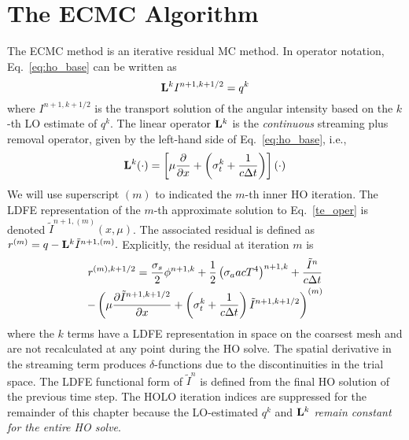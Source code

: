 \section{The ECMC Algorithm}
\label{sec:ecmc}

The ECMC method is an iterative residual MC method. 
In operator notation, Eq.~\eqref{eq:ho_base} can be written as
\begin{equation}\label{te_oper}
\mathbf{L}^k I^{n+1,k+1/2}  = q^{k}
\end{equation}
where $I^{n+1,k+1/2}$ is the transport solution of the angular intensity based on the
$k$-th LO estimate of $q^k$.
The linear operator $\mathbf{L}^k$ is the \emph{continuous} streaming plus
removal operator, given by the left-hand
side of Eq.~\eqref{eq:ho_base}, i.e.,
\begin{equation}
    \mathbf{L}^k(\cdot) = \left[\mu \frac{\partial }{\partial x} + \left(\sigma_t^k + \frac{1}{c \Delta t
    }\right)\right] \left(\cdot\right)
\end{equation}
We will use superscript $(m)$ to indicated the $m$-th inner HO iteration.  The LDFE
representation of the $m$-th
approximate solution to Eq.~\eqref{te_oper} is denoted
$\tilde{I}^{n+1,(m)}(x,\mu)$.    
The associated residual is defined as $r^{(m)} = q - \mathbf{L}^k\tilde{I}^{n+1,(m)}.$ 
Explicitly, the residual at iteration $m$ is
\begin{multline}\label{eq:resid}
r^{(m),k+1/2} = \frac{\sigma_s}{2} \phi^{n+1,k} +\frac{1}{2} \left(\sigma_a a c T^4
\right)^{n+1,k} + \frac{\tilde{I}^n}{c \Delta t } \\ -
\left(\mu \frac{\partial \tilde{I}^{n+1,k+1/2}}{\partial x} +
\left(\sigma_t^k + \frac{1}{c \Delta t }\right) \tilde{I}^{n+1,k+1/2}\right)^{(m)}
\end{multline}
where the $k$ terms have a LDFE representation in space on the coarsest mesh and are not recalculated at any point during
the HO solve.  The spatial derivative in the streaming term produces $\delta$-functions due to the discontinuities in the trial space.
The LDFE functional form of $\tilde{I}^n$ is defined from the final HO
solution of the previous time step.  The HOLO iteration indices are suppressed for the
remainder of this chapter because the LO-estimated $q^{k}$ and $\mathbf{L}^{k}$
\emph{remain constant for the entire HO solve}.

